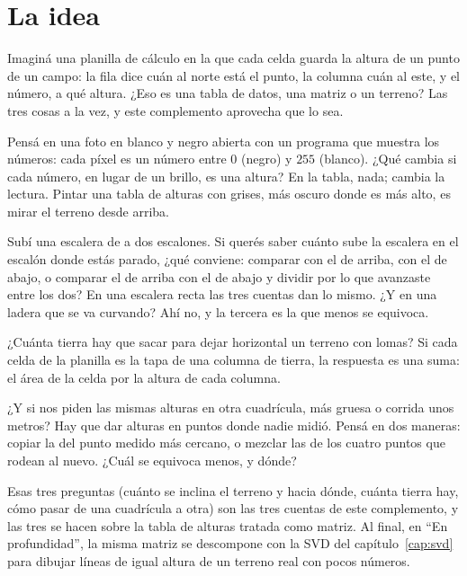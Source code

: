 \label{cap:dem}

\section{La idea}

Imaginá una planilla de cálculo en la que cada celda guarda la altura de un punto de un campo:
la fila dice cuán al norte está el punto, la columna cuán al este, y el número, a qué altura.
¿Eso es una tabla de datos, una matriz o un terreno? Las tres cosas a la vez, y este
complemento aprovecha que lo sea.

Pensá en una foto en blanco y negro abierta con un programa que muestra los números: cada
píxel es un número entre \(0\) (negro) y \(255\) (blanco). ¿Qué cambia si cada número, en lugar
de un brillo, es una altura? En la tabla, nada; cambia la lectura. Pintar una tabla de alturas
con grises, más oscuro donde es más alto, es mirar el terreno desde arriba.

Subí una escalera de a dos escalones. Si querés saber cuánto sube la escalera en el escalón
donde estás parado, ¿qué conviene: comparar con el de arriba, con el de abajo, o comparar el de
arriba con el de abajo y dividir por lo que avanzaste entre los dos? En una escalera recta las
tres cuentas dan lo mismo. ¿Y en una ladera que se va curvando? Ahí no, y la tercera es la que
menos se equivoca.

¿Cuánta tierra hay que sacar para dejar horizontal un terreno con lomas? Si cada celda de la
planilla es la tapa de una columna de tierra, la respuesta es una suma: el área de la celda
por la altura de cada columna.

¿Y si nos piden las mismas alturas en otra cuadrícula, más gruesa o corrida unos metros? Hay que
dar alturas en puntos donde nadie midió. Pensá en dos maneras: copiar la del punto medido
más cercano, o mezclar las de los cuatro puntos que rodean al nuevo. ¿Cuál se equivoca menos, y
dónde?

Esas tres preguntas (cuánto se inclina el terreno y hacia dónde, cuánta tierra hay, cómo pasar
de una cuadrícula a otra) son las tres cuentas de este complemento, y las tres se hacen sobre
la tabla de alturas tratada como matriz. Al final, en \enquote{En profundidad}, la misma matriz
se descompone con la SVD del capítulo~\ref{cap:svd} para dibujar líneas de igual altura de un
terreno real con pocos números.

